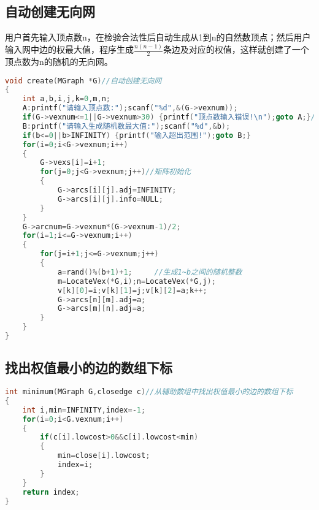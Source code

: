 \documentclass{DateStructure}
\begin{document}
\subsection{自动创建无向网}
用户首先输入顶点数n，在检验合法性后自动生成从1到n的自然数顶点；然后用户输入网中边的权最大值，程序生成$\frac{n(n-1)}{2}$条边及对应的权值，这样就创建了一个顶点数为n的随机的无向网。
\begin{lstlisting}[language=c,caption={create}]
void create(MGraph *G)//自动创建无向网
{
    int a,b,i,j,k=0,m,n;
    A:printf("请输入顶点数:");scanf("%d",&(G->vexnum));
    if(G->vexnum<=1||G->vexnum>30) {printf("顶点数输入错误!\n");goto A;}//顶点个数不合法
    B:printf("请输入生成随机数最大值:");scanf("%d",&b);
    if(b<=0||b>INFINITY) {printf("输入超出范围!");goto B;}
    for(i=0;i<G->vexnum;i++)
    {
        G->vexs[i]=i+1;
        for(j=0;j<G->vexnum;j++)//矩阵初始化
        {
            G->arcs[i][j].adj=INFINITY;
            G->arcs[i][j].info=NULL;
        }
    }
    G->arcnum=G->vexnum*(G->vexnum-1)/2;
    for(i=1;i<=G->vexnum;i++)
    {
        for(j=i+1;j<=G->vexnum;j++)
        {
            a=rand()%(b+1)+1;     //生成1~b之间的随机整数
            m=LocateVex(*G,i);n=LocateVex(*G,j);
            v[k][0]=i;v[k][1]=j;v[k][2]=a;k++;
            G->arcs[n][m].adj=a;
            G->arcs[m][n].adj=a;
        }
    }
}
\end{lstlisting}
\subsection{找出权值最小的边的数组下标}
\begin{lstlisting}[language=c,caption={minimum}]
int minimum(MGraph G,closedge c)//从辅助数组中找出权值最小的边的数组下标
{
    int i,min=INFINITY,index=-1;
    for(i=0;i<G.vexnum;i++) 
    {
        if(c[i].lowcost>0&&c[i].lowcost<min)
        {
            min=close[i].lowcost;
            index=i;
        }
    }
    return index;
}
\end{lstlisting}
\end{document}
